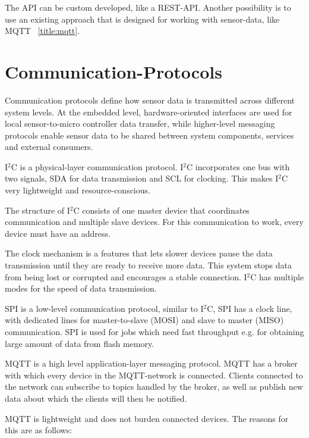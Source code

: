 The API can be custom developed, like a REST-API. Another possibility is to use an existing approach that is designed for working with sensor-data, like MQTT ~\ref{title:mqtt}.

\section{Communication-Protocols}
\label{title:communication}
Communication protocols define how sensor data is transmitted across different system levels. At the embedded level, hardware-oriented interfaces are used for local sensor-to-micro controller data transfer, while higher-level messaging protocols enable sensor data to be shared between system components, services and external consumers.

I$^2$C is a physical-layer communication protocol. I$^2$C incorporates one bus with two signals, SDA for data transmission and SCL for clocking. This makes I$^2$C very lightweight and resource-conscious. 

The structure of I$^2$C consists of one master device that coordinates communication and multiple slave devices. For this communication to work, every device must have an address.

The clock mechanism is a features that lets slower devices pause the data transmission until they are ready to receive more data. This system stops data from being lost or corrupted and encourages a stable connection. I$^2$C has multiple modes for the speed of data transmission. 

\cite{LRWeb:40}

SPI is a low-level communication protocol, similar to I$^2$C, SPI has a clock line, with dedicated lines for master-to-slave (MOSI) and slave to master (MISO) communication. SPI is used for jobs which need fast throughput e.g. for obtaining large amount of data from flash memory.

\cite{LRWeb:40}

\label{title:mqtt}
MQTT is a high level application-layer messaging protocol. MQTT has a broker with which every device in the MQTT-network is connected. Clients connected to the network can subscribe to topics handled by the broker, as well as publish new data about which the clients will then be notified.

MQTT is lightweight and does not burden connected devices. The reasons for this are as follows:

